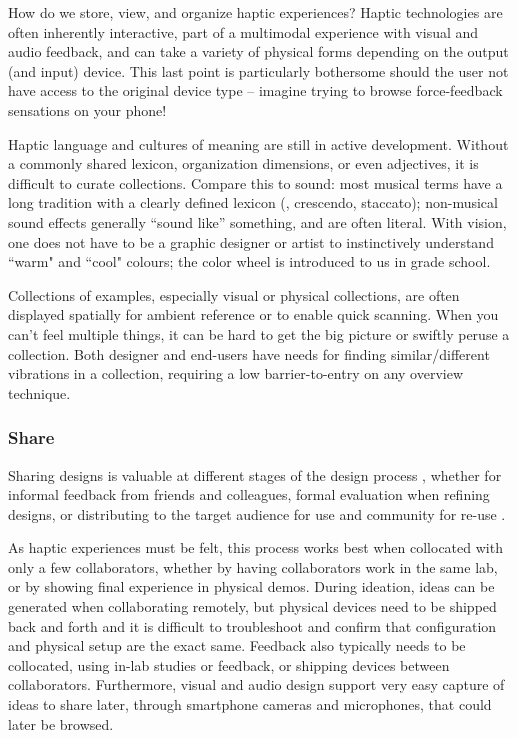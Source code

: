     How do we store, view, and organize haptic experiences?
    Haptic technologies are often inherently interactive, part of a multimodal experience with visual and audio feedback, and can take a variety of physical forms depending on the output (and input) device.
    This last point is particularly bothersome should the user not have access to the original device type -- imagine trying to browse force-feedback sensations on your phone!

    Haptic language and cultures of meaning are still in active development.
    Without a commonly shared lexicon, organization dimensions, or even adjectives, it is difficult to curate collections.
    Compare this to sound: most musical terms have a long tradition with a clearly defined lexicon (\eg, crescendo, staccato); non-musical sound effects generally ``sound like'' something, and are often literal.
    With vision, one does not have to be a graphic designer or artist to instinctively understand ``warm" and ``cool" colours; the color wheel is introduced to us in grade school.  
    
    Collections of examples, especially visual or physical collections, are often displayed spatially for ambient reference or to enable quick scanning.
    When you can't feel multiple things, it can be hard to get the big picture or swiftly peruse a collection.
    Both designer and end-users have needs for finding similar/different vibrations in a collection, requiring a low barrier-to-entry on any overview technique.



%
%
\subsubsection{Share} 
Sharing designs is valuable at different stages of the design process \cite{Kulkarni2012}, whether for informal feedback from friends and colleagues, formal evaluation when refining designs, or distributing to the target audience for use and community for re-use \cite{Shneiderman2007}.

As haptic experiences must be felt, this process works best when collocated with only a few collaborators, whether by having collaborators work in the same lab, or by showing final experience in physical demos.
During ideation, ideas can be generated when collaborating remotely, but physical devices need to be shipped back and forth and it is difficult to troubleshoot and confirm that configuration and physical setup are the exact same.
Feedback also typically needs to be collocated, using in-lab studies or feedback, or shipping devices between collaborators.
Furthermore, visual and audio design support very easy capture of ideas to share later, through smartphone cameras and microphones, that could later be browsed.

